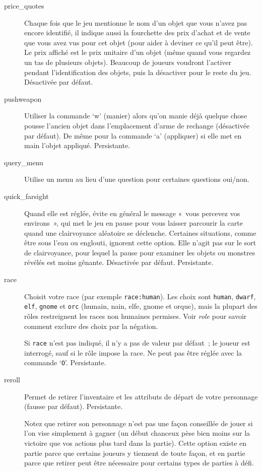 \documentclass[titlepage]{article}
\begin{document}
\begin{description}
\item[{price\_quotes}]
Chaque fois que le jeu mentionne le nom d'un objet que vous n'avez pas
encore identifié, il indique aussi la fourchette des prix d'achat et de
vente que vous avez vus pour cet objet (pour aider à deviner ce qu'il peut
être).
Le prix affiché est le prix unitaire d'un objet (même quand vous regardez
un tas de plusieurs objets).
Beaucoup de joueurs voudront l'activer pendant l'identification des objets,
puis la désactiver pour le reste du jeu.
Désactivée par défaut.

\item[{pushweapon}]
Utiliser la commande `w' (manier) alors qu'on manie déjà quelque chose
pousse l'ancien objet dans l'emplacement d'arme de rechange (désactivée par
défaut).
De même pour la commande `a' (appliquer) si elle met en main l'objet
appliqué.
Persistante.

\item[{query\_menu}]
Utilise un menu au lieu d'une question pour certaines questions oui/non.

\item[{quick\_farsight}]
Quand elle est réglée, évite en général le message «~vous percevez vos
environs~», qui met le jeu en pause pour vous laisser parcourir la carte
quand une clairvoyance aléatoire se déclenche.
Certaines situations, comme être sous l'eau ou englouti, ignorent cette
option.
Elle n'agit pas sur le sort de clairvoyance, pour lequel la pause pour
examiner les objets ou monstres révélés est moins gênante.
Désactivée par défaut.
Persistante.

\item[{race}]
Choisit votre race (par exemple \texttt{race:human}).
Les choix sont \texttt{human}, \texttt{dwarf}, \texttt{elf}, \texttt{gnome} et
\texttt{orc} (humain, nain, elfe, gnome et orque), mais la plupart des rôles
restreignent les races non humaines permises.
Voir
\textit{role}
pour savoir comment exclure des choix par la négation.


Si \texttt{race} n'est pas indiqué, il n'y a pas de valeur par défaut~; le
joueur est interrogé, sauf si le rôle impose la race.
Ne peut pas être réglée avec la commande `\texttt{O}'.
Persistante.

\item[{reroll}]
Permet de retirer l'inventaire et les attributs de départ de votre
personnage (fausse par défaut).
Persistante.


Notez que retirer son personnage n'est pas une façon conseillée de jouer si
l'on vise simplement à gagner (un début chanceux pèse bien moins sur la
victoire que vos actions plus tard dans la partie).
Cette option existe en partie parce que certains joueurs y tiennent de
toute façon, et en partie parce que retirer peut être nécessaire pour
certains types de parties à défi.


\end{description}
\end{document}
